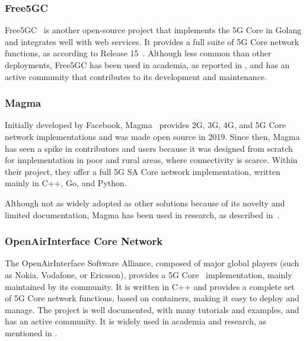 \subsubsection{Free5GC}
\label{sec:free5gc}

Free5GC~\cite{free5gc_repo} is another open-source project that implements the 5G Core in Golang and integrates well with web services. It provides a full suite of 5G Core network functions, as according to  Release 15~\cite{3GPPRelease15}. Although less common than other deployments, Free5GC has been used in academia, as reported in \cite{horstmann2025open5gcube}, and has an active community that contributes to its development and maintenance.

\subsubsection{Magma}
\label{sec:magma}

Initially developed by Facebook, Magma~\cite{magma_repo} provides 2G, 3G, 4G, and 5G Core network implementations and was made open source in 2019. Since then, Magma has seen a spike in contributors and users because it was designed from scratch for implementation in poor and rural areas, where connectivity is scarce. Within their project, they offer a full 5G \gls{SA} Core network implementation, written mainly in C++, Go, and Python. %

Although not as widely adopted as other solutions because of its novelty and limited documentation, Magma has been used in research, as described in~\cite{hasan2023building}.

\subsubsection{OpenAirInterface Core Network}
\label{sec:openairinterface}

The OpenAirInterface Software Alliance, composed of major global players (such as Nokia, Vodafone, or Ericsson), provides a 5G Core~\cite{oai_core_repo} implementation, mainly maintained by its community. It is written in C++ and provides a complete set of 5G Core network functions, based on containers, making it easy to deploy and manage. The project is well documented, with many tutorials and examples, and has an active community. It is widely used in academia and research, as mentioned in \cites{bonati2025_5gct}{horstmann2025open5gcube}{vazquez2024maq5g}.


